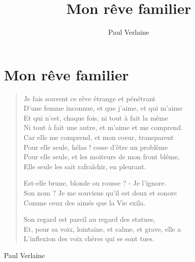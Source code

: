 \documentclass[12pt, a4paper]{report}
\title{Mon rêve familier}
\author{Paul Verlaine}
\begin{document}
\section*{Mon rêve familier}
\beginnumbering
\pstart
\begin{verse}
Je fais souvent ce rêve étrange et pénétrant\\
D'une femme inconnue, et que j'aime, et qui m'aime\\
Et qui n'est, chaque fois, ni tout à fait la même\\
Ni tout à fait une autre, et m'aime et me comprend.\\

Car elle me comprend, et mon coeur, transparent\\
Pour elle seule, hélas ! cesse d'être un problème\\
Pour elle seule, et les moiteurs de mon front blême,\\
Elle seule les sait rafraîchir, en pleurant.

Est-elle brune, blonde ou rousse ? - Je l'ignore.\\
Son nom ? Je me souviens qu'il est doux et sonore\\
Comme ceux des aimés que la Vie exila.

Son regard est pareil au regard des statues,\\
Et, pour sa voix, lointaine, et calme, et grave, elle a\\
L'inflexion des voix chères qui se sont tues.
\end{verse}
\pend
\endnumbering
\begin{flushright}
Paul Verlaine
\end{flushright}
\end{document}
